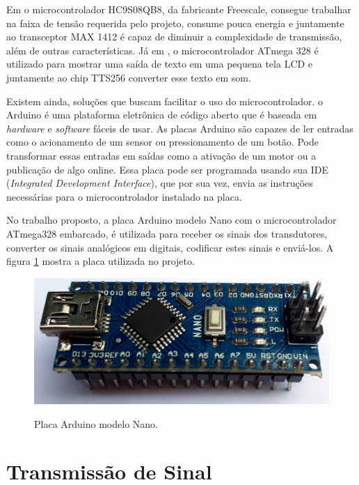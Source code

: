 \documentclass[
	12pt,				%
	openright,			%
	oneside,			%
	a4paper,			%
	english,			%
	brazil				%
	]{abntex2}
\begin{document}
		Em \cite{michela2013rehab} o microcontrolador HC9S08QB8, da fabricante Freescale, consegue trabalhar na faixa de tensão requerida pelo projeto, consume pouca energia e juntamente ao transceptor MAX 1412 é capaz de diminuir a complexidade de transmissão, além de outras características. Já em \cite{anbarasi2013deafmute}, o microcontrolador ATmega 328 é utilizado para mostrar uma saída de texto em uma pequena tela LCD e juntamente ao chip TTS256 converter esse texto em som.

		Existem ainda, soluções que buscam facilitar o uso do microcontrolador. o Arduino é uma plataforma eletrônica de código aberto que é baseada em \textit{hardware} e \textit{software} fáceis de usar. As placas Arduino são capazes de ler entradas como o acionamento de um sensor ou pressionamento de um botão. Pode transformar essas entradas em saídas como a ativação de um motor ou a publicação de algo online. Essa placa pode ser programada usando sua IDE (\textit{Integrated Development Interface}), que por sua vez, envia as instruções necessárias para o microcontrolador instalado na placa.\cite{arduinosite} 

		No trabalho proposto, a placa Arduino modelo Nano com o microcontrolador ATmega328 embarcado, é utilizada para receber os sinais dos transdutores, converter os sinais analógicos em digitais, codificar estes sinais e enviá-los. A figura \ref{Fig:arduino-nano1} mostra a placa utilizada no projeto.
		
		\begin{figure}[h!]
			\centering
			\caption{Placa Arduino modelo Nano.}
  		\includegraphics[width=12cm]{./figures/arduino-nano1.jpg}
  		\label{Fig:arduino-nano1}
		\end{figure}


		\section{Transmissão de Sinal}
		
\end{document}
